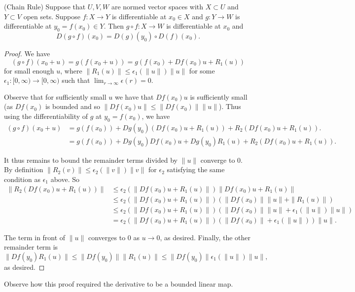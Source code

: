 \documentclass[twoside, a4paper, 10pt]{amsart}
\begin{document}
\begin{lemma}(Chain Rule) Suppose that $U,V,W$ are normed vector spaces with $X \subset U$ and $Y \subset V$ open sets. Suppose $f:X \to Y$ is differentiable at $x_0 \in X$ and $g:Y \to W$ is differentiable at $y_0 = f(x_0) \in Y$. Then $g \circ f:X \to W$ is differentiable at $x_0$ and $$D(g \circ f)(x_0) = D(g)(y_0) \circ D(f)(x_0).$$ \end{lemma}

\begin{proof} We have $$(g \circ f)(x_0 + u) = g(f(x_0 +u)) = g(f(x_0) + Df(x_0)u + R_1(u))$$ for small enough $u$, where $\|R_1(u)\| \leq \epsilon_1(\|u\|)\|u\|$ for some $\epsilon_1:[0,\infty) \to [0,\infty)$ such that $\lim_{r \to \infty} \epsilon(r) = 0$.

Observe that for sufficiently small $u$ we have that $Df(x_0)u$ is sufficiently small (as $Df(x_0)$ is bounded and so $\|Df(x_0) u \| \leq \|Df(x_0)\| \|u\|$). Thus using the differentiability of $g$ at $y_0 = f(x_0)$, we have
\begin{align*}(g \circ f)(x_0+u) &= g(f(x_0)) + Dg(y_0)(Df(x_0)u + R_1(u)) + R_2(Df(x_0)u + R_1(u)). \\
&= g(f(x_0)) + Dg(y_0)Df(x_0)u  + Dg(y_0)R_1(u) + R_2(Df(x_0)u + R_1(u)).  \end{align*}

It thus remains to bound the remainder terms divided by $\|u\|$ converge to $0$. By definition $\|R_2(v)\| \leq \epsilon_2(\|v\|) \|v\|$ for $\epsilon_2$ satisfying the same condition as $\epsilon_1$ above. So
\begin{align*}\|R_2(Df(x_0)u + R_1(u))\| &\leq \epsilon_2(\|Df(x_0)u + R_1(u)\|) \|Df(x_0)u + R_1(u)\|  \\
& \leq  \epsilon_2(\|Df(x_0)u + R_1(u) \|) \left(\|Df(x_0)\| \|u\| + \|R_1(u)\| \right) \\
& \leq \epsilon_2(\|Df(x_0)u + R_1(u)\|) \left(\|Df(x_0)\| \|u\| + \epsilon_1(\|u\|)\|u\| \right) \\
& = \epsilon_2(\|Df(x_0)u + R_1(u)\|) \left(\|Df(x_0)\| + \epsilon_1(\|u\|) \right) \|u\|. 
\end{align*}

The term in front of $\|u\|$ converges to $0$ as $u \to 0$, as desired. Finally, the other remainder term is $$\| Df(y_0)R_1(u) \| \leq \|Df(y_0)\| \|R_1(u)\| \leq \|Df(y_0)\|\epsilon_1(\|u\|) \|u\|,$$
as desired.  \end{proof}

\begin{remark} Observe how this proof required the derivative to be a bounded linear map. \end{remark}
\end{document}
